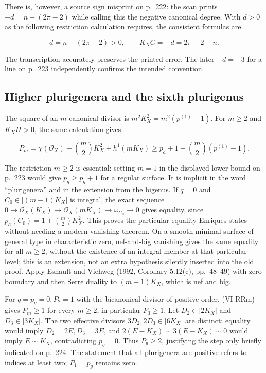 There is, however, a source sign misprint on p.~222: the scan prints \(-d=n-(2\pi-2)\) while calling this the negative canonical degree. With \(d>0\) as the following restriction calculation requires, the consistent formulas are

\[
d=n-(2\pi-2)>0,
\qquad K_X C=-d=2\pi-2-n.
\]

The transcription accurately preserves the printed error. The later \(-d=-3\) for a line on p.~223 independently confirms the intended convention.

\subsection{Higher plurigenera and the sixth plurigenus}

The square of an \(m\)-canonical divisor is \(m^2K_X^2=m^2(p^{(1)}-1)\). For \(m\geq2\) and \(K_X H>0\), the same calculation gives

\[
P_m=\chi(\mathcal O_X)+\binom m2K_X^2+h^1(mK_X)
\geq p_a+1+\binom m2(p^{(1)}-1).
\tag{VI-RRm}
\]

The restriction \(m\geq2\) is essential: setting \(m=1\) in the displayed lower bound on p.~223 would give \(p_g\geq p_g+1\) for a regular surface. It is implicit in the word ``plurigenera'' and in the extension from the bigenus. If \(q=0\) and \(C_0\in|(m-1)K_X|\) is integral, the exact sequence \(0\to\mathcal O_X(K_X)\to\mathcal O_X(mK_X)\to\omega_{C_0}\to0\) gives equality, since \(p_a(C_0)=1+\binom m2K_X^2\). This proves the particular equality Enriques states without needing a modern vanishing theorem. On a smooth minimal surface of general type in characteristic zero, nef-and-big vanishing gives the same equality for all \(m\geq2\), without the existence of an integral member at that particular level; this is an extension, not an extra hypothesis silently inserted into the old proof. Apply Esnault and Viehweg (1992, Corollary 5.12(c), pp.~48--49) with zero boundary and then Serre duality to \((m-1)K_X\), which is nef and big.

For \(q=p_g=0,P_2=1\) with the bicanonical divisor of positive order, (VI-RRm) gives \(P_m\geq1\) for every \(m\geq2\), in particular \(P_3\geq1\). Let \(D_2\in|2K_X|\) and \(D_3\in|3K_X|\). The two effective divisors \(3D_2,2D_3\in|6K_X|\) are distinct: equality would imply \(D_2=2E,D_3=3E\), and \(2(E-K_X)\sim3(E-K_X)\sim0\) would imply \(E\sim K_X\), contradicting \(p_g=0\). Thus \(P_6\geq2\), justifying the step only briefly indicated on p.~224. The statement that all plurigenera are positive refers to indices at least two; \(P_1=p_g\) remains zero.

